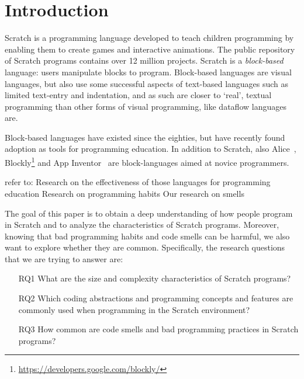 \documentclass{sig-alternate}
\begin{document}



\section{Introduction}

Scratch is a programming language developed to teach children programming by enabling them to create games and interactive animations. The public repository of Scratch programs contains over 12 million projects. Scratch is a \emph{block-based} language: users manipulate blocks to program. Block-based languages are visual languages, but also use some successful aspects of text-based languages such as limited text-entry and indentation, and as such are closer to `real', textual programming than other forms of visual programming, like dataflow languages are.

Block-based languages have existed since the eighties, but have recently found adoption as tools for programming education. In addition to Scratch, also Alice~\cite{conway_alice:_1994}, Blockly\footnote{\url{https://developers.google.com/blockly/}} and App Inventor~\cite{wolber_app_2011} are block-languages aimed at novice programmers.

refer to:
Research on the effectiveness of those languages for programming education
Research on programming habits
Our research on smells

The goal of this paper is to obtain a deep understanding of how people program in Scratch and to analyze the characteristics of Scratch programs. Moreover, knowing that bad programming habits and code smells can be harmful, we also want to explore whether they are common. Specifically, the research questions that we are trying to answer are:

\begin{itemize}
\item[RQ1] What are the size and complexity characteristics of Scratch programs?
\item[RQ2] Which coding abstractions and programming concepts and features are commonly used when programming in the Scratch environment?
\item[RQ3] How common are code smells and bad programming practices in Scratch programs?
\end{itemize}
\end{document}
